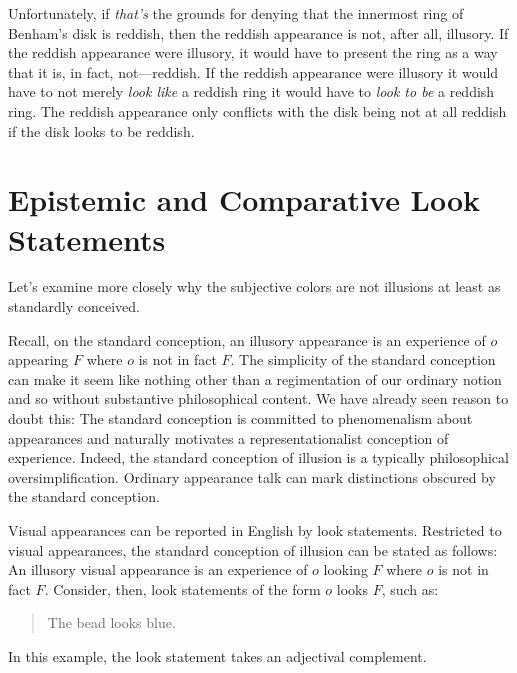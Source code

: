 \documentclass[12pt]{article}
\begin{document}
Unfortunately, if \emph{that's} the grounds for denying that the innermost ring of Benham's disk is reddish, then the reddish appearance is not, after all, illusory. If the reddish appearance were illusory, it would have to present the ring as a way that it is, in fact, not---reddish. If the reddish appearance were illusory it would have to not merely \emph{look like} a reddish ring it would have to \emph{look to be} a reddish ring. The reddish appearance only conflicts with the disk being not at all reddish if the disk looks to be reddish.



\section{Epistemic and Comparative Look Statements}\label{sec:epistemic_and_comparative_look_statements} %

Let's examine more closely why the subjective colors are not illusions at least as standardly conceived. 

Recall, on the standard conception, an illusory appearance is an experience of \( o \) appearing \( F \) where \( o \) is not in fact \( F \). The simplicity of the standard conception can make it seem like nothing other than a regimentation of our ordinary notion and so without substantive philosophical content. We have already seen reason to doubt this: The standard conception is committed to phenomenalism about appearances and naturally motivates a representationalist conception of experience. Indeed, the standard conception of illusion is a typically philosophical oversimplification. Ordinary appearance talk can mark distinctions obscured by the standard conception.

Visual appearances can be reported in English by look statements. Restricted to visual appearances, the standard conception of illusion can be stated as follows: An illusory visual appearance is an experience of \( o \) looking \( F \) where \( o \) is not in fact \( F \). Consider, then, look statements of the form \( o \) looks \( F \), such as:
	\begin{quote}
		The bead looks blue.
	\end{quote}
In this example, the look statement takes an adjectival complement. 
\end{document}
